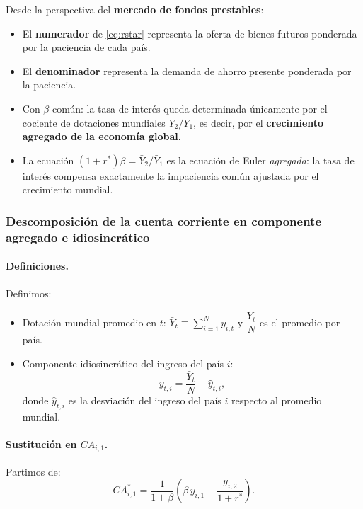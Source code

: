 \begin{interpretacion}
Desde la perspectiva del \textbf{mercado de fondos prestables}:
\begin{itemize}
    \item El \textbf{numerador} de \eqref{eq:rstar} representa la oferta de bienes
          futuros ponderada por la paciencia de cada país.
    \item El \textbf{denominador} representa la demanda de ahorro presente
          ponderada por la paciencia.
    \item Con $\beta$ común: la tasa de interés queda determinada únicamente por
          el cociente de dotaciones mundiales $\bar{Y}_2 / \bar{Y}_1$, es decir,
          por el \textbf{crecimiento agregado de la economía global}.
    \item La ecuación $(1+r^*)\beta = \bar{Y}_2/\bar{Y}_1$ es la ecuación de Euler
          \textit{agregada}: la tasa de interés compensa exactamente la impaciencia
          común ajustada por el crecimiento mundial.
\end{itemize}
\end{interpretacion}

\subsubsection*{Descomposición de la cuenta corriente en componente agregado
e idiosincrático}

\paragraph{Definiciones.}
Definimos:
\begin{itemize}
    \item Dotación mundial promedio en $t$:
          $\bar{Y}_t \equiv \displaystyle\sum_{i=1}^N y_{i,t}$
          y $\dfrac{\bar{Y}_t}{N}$ es el promedio por país.
    \item Componente idiosincrático del ingreso del país $i$:
          \[
              y_{t,i} = \frac{\bar{Y}_t}{N} + \hat{y}_{t,i},
          \]
          donde $\hat{y}_{t,i}$ es la desviación del ingreso del país $i$
          respecto al promedio mundial.
\end{itemize}

\paragraph{Sustitución en $CA_{i,1}$.}
Partimos de:
\[
    CA_{i,1}^* = \frac{1}{1+\beta}\left(\beta\,y_{i,1} - \frac{y_{i,2}}{1+r^*}\right).
\]

